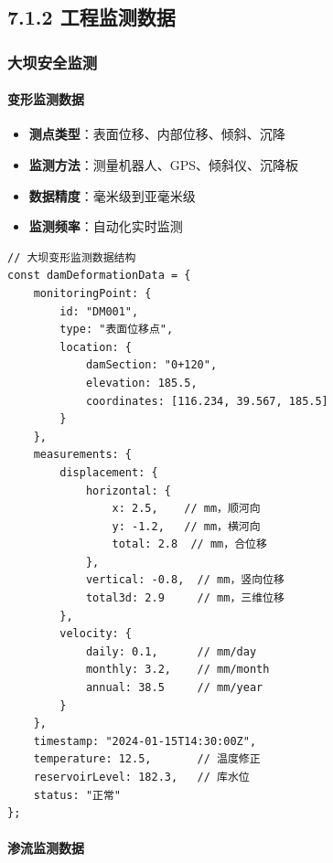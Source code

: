 \subsection{7.1.2
工程监测数据}\label{ux5de5ux7a0bux76d1ux6d4bux6570ux636e}

\subsubsection{大坝安全监测}\label{ux5927ux575dux5b89ux5168ux76d1ux6d4b}

\paragraph{变形监测数据}\label{ux53d8ux5f62ux76d1ux6d4bux6570ux636e}

\begin{itemize}
\tightlist
\item
  \textbf{测点类型}：表面位移、内部位移、倾斜、沉降
\item
  \textbf{监测方法}：测量机器人、GPS、倾斜仪、沉降板
\item
  \textbf{数据精度}：毫米级到亚毫米级
\item
  \textbf{监测频率}：自动化实时监测
\end{itemize}

\begin{lstlisting}
// 大坝变形监测数据结构
const damDeformationData = {
    monitoringPoint: {
        id: "DM001",
        type: "表面位移点",
        location: {
            damSection: "0+120",
            elevation: 185.5,
            coordinates: [116.234, 39.567, 185.5]
        }
    },
    measurements: {
        displacement: {
            horizontal: {
                x: 2.5,    // mm，顺河向
                y: -1.2,   // mm，横河向
                total: 2.8  // mm，合位移
            },
            vertical: -0.8,  // mm，竖向位移
            total3d: 2.9     // mm，三维位移
        },
        velocity: {
            daily: 0.1,      // mm/day
            monthly: 3.2,    // mm/month
            annual: 38.5     // mm/year
        }
    },
    timestamp: "2024-01-15T14:30:00Z",
    temperature: 12.5,       // 温度修正
    reservoirLevel: 182.3,   // 库水位
    status: "正常"
};
\end{lstlisting}

\paragraph{渗流监测数据}\label{ux6e17ux6d41ux76d1ux6d4bux6570ux636e}

